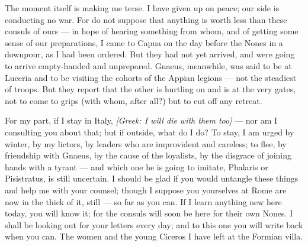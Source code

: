 

 The moment itself is making me terse. I have given up on peace; our side is conducting no war. For do not suppose that anything is worth less than these consuls of ours --- in hope of hearing something from whom, and of getting some sense of our preparations, I came to Capua on the day before the Nones in a downpour, as I had been ordered. But they had not yet arrived, and were going to arrive empty-handed and unprepared. Gnaeus, meanwhile, was said to be at Luceria and to be visiting the cohorts of the Appian legions --- not the steadiest of troops. But they report that the other is hurtling on and is at the very gates, not to come to grips (with whom, after all?) but to cut off any retreat.

 For my part, if I stay in Italy, \textit{[Greek: I will die with them too]} --- nor am I consulting you about that; but if outside, what do I do? To stay, I am urged by winter, by my lictors, by leaders who are improvident and careless; to flee, by friendship with Gnaeus, by the cause of the loyalists, by the disgrace of joining hands with a tyrant --- and which one he is going to imitate, Phalaris or Pisistratus, is still uncertain. I should be glad if you would untangle these things and help me with your counsel; though I suppose you yourselves at Rome are now in the thick of it, still --- so far as you can. If I learn anything new here today, you will know it; for the consuls will soon be here for their own Nones. I shall be looking out for your letters every day; and to this one you will write back when you can. The women and the young Ciceros I have left at the Formian villa.

